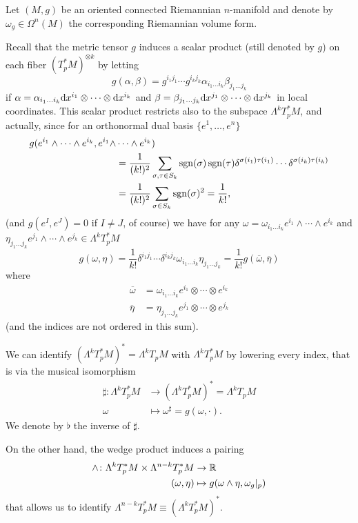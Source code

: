Let \((M,g)\) be an oriented connected Riemannian \(n\)-manifold and denote by \(\omega_g \in \Omega^n(M)\) the corresponding Riemannian volume form. 

Recall that the metric tensor \(g\) induces a scalar product (still denoted by \(g\)) on each fiber \((T^*_pM)^{\otimes k}\) by letting
\[
    g(\alpha,\beta) = g^{i_1j_1}\cdots g^{i_kj_k}\alpha_{i_1 \dots i_k} \beta_{j_1 \dots j_k}
\]
if \(\alpha = \alpha_{i_1 \dots i_k}\mathrm{d} x^{i_1}\otimes \cdots \otimes\mathrm{d} x^{i_k}\) and \(\beta = \beta_{j_1 \dots j_k}\mathrm{d} x^{j_1}\otimes \dots \otimes \mathrm{d} x^{j_k} \) in local coordinates. This scalar product restricts also to the subspace \(\Lambda^kT^*_pM\), and actually, since for an orthonormal dual basis \(\{e^1,\dots,e^n\}\)
\[
\begin{split}
    g(e^{i_1} \wedge \cdots \wedge e^{i_k},e^{i_1} \wedge&\cdots \wedge e^{i_k}) \\
    &= \frac{1}{(k!)^2}\sum_{\sigma,\tau \in S_k}\operatorname{sgn}(\sigma)\operatorname{sgn}(\tau)\delta^{\sigma(i_1)\tau(i_1)} \cdots \delta^{\sigma(i_k)\tau(i_k)} \\
    &= \frac{1}{(k!)^2}\sum_{\sigma \in S_k}\operatorname{sgn}(\sigma)^2 = \frac{1}{k!},
\end{split}
\]
(and \(g(e^I, e^J)=0\) if \(I\ne J\), of course) we have for any \(\omega = \omega_{i_1 \dots i_k}e^{i_1} \wedge \cdots \wedge e^{i_k}\) and \(\eta_{j_1 \dots j_k}e^{j_1} \wedge \cdots \wedge e^{j_k} \in \Lambda^kT^*_pM\)
\[
    g(\omega,\eta) = \frac{1}{k!}\delta^{i_1j_1}\cdots \delta^{i_kj_k}\omega_{i_1 \dots i_k} \eta_{j_1 \dots j_k} = \frac{1}{k!}g(\overline{\omega},\overline{\eta})
\]
where
\[
\begin{split}
    \overline{\omega} &= \omega_{i_1 \dots i_k} e^{i_1} \otimes \cdots \otimes e^{i_k}\\
    \overline{\eta} &= \eta_{j_1 \dots j_k} e^{j_1} \otimes \cdots \otimes e^{j_k}
\end{split}
\]
(and the indices are not ordered in this sum).


We can identify \((\Lambda^kT^*_pM)^*=\Lambda^kT_pM\) with \(\Lambda^kT^*_pM\) by lowering every index, that is via the musical isomorphism
\begin{align*}
    \sharp \colon \Lambda^kT^*_pM &\to (\Lambda^{k}T^*_pM)^*=\Lambda^kT_pM \\
    \omega &\mapsto \omega^\sharp = g(\omega, \cdot ).
\end{align*}
We denote by \(\flat\) the inverse of \(\sharp\).

On the other hand, the wedge product induces a pairing
\begin{align*}
    \wedge \colon \Lambda^kT^*_pM \times \Lambda^{n-k}T^*_pM &\to \mathbb{R}\\
    (\omega,\eta) &\mapsto g(\omega\wedge \eta, \omega_g|_p)
\end{align*}
that allows us to identify \(\Lambda^{n-k}T^*_pM \equiv (\Lambda^kT^*_pM)^*\). 

